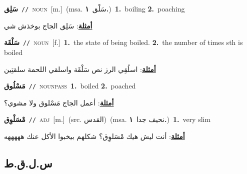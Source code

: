 \documentclass[10pt,a4paper,twoside]{article} %
\begin{document}
\begin{multicols}{2}
{\setlength\topsep{0pt}\textbf{\foreignlanguage{arabic}{سَلِق}}\ {\color{gray}\texttt{//}\color{black}}\ \textsc{noun}\ [m.]\ \color{gray}(msa. \foreignlanguage{arabic}{سَلْق}~\foreignlanguage{arabic}{\textbf{١.}})\color{black}\ \textbf{1.}~boiling  \textbf{2.}~poaching\  \begin{flushright}\color{gray}\foreignlanguage{arabic}{\textbf{\underline{\foreignlanguage{arabic}{أمثلة}}}: سَلِق الجاج بوخذش شي}\end{flushright}\color{black}} \vspace{2mm}

{\setlength\topsep{0pt}\textbf{\foreignlanguage{arabic}{سَلْقَة}}\ {\color{gray}\texttt{//}\color{black}}\ \textsc{noun}\ [f.]\ \textbf{1.}~the state of being boiled.  \textbf{2.}~the number of times sth is boiled\  \begin{flushright}\color{gray}\foreignlanguage{arabic}{\textbf{\underline{\foreignlanguage{arabic}{أمثلة}}}: اسلُقِي الرز نص سَلْقَة واسلقي اللحمة سلقتِين}\end{flushright}\color{black}} \vspace{2mm}

{\setlength\topsep{0pt}\textbf{\foreignlanguage{arabic}{مَسْلُوق}}\ {\color{gray}\texttt{//}\color{black}}\ \textsc{noun\textunderscore pass}\ \textbf{1.}~boiled  \textbf{2.}~poached\  \begin{flushright}\color{gray}\foreignlanguage{arabic}{\textbf{\underline{\foreignlanguage{arabic}{أمثلة}}}: أعمل الجاج مَسْلوق ولا مشوي؟}\end{flushright}\color{black}} \vspace{2mm}

{\setlength\topsep{0pt}\textbf{\foreignlanguage{arabic}{مْسَلْوِق}}\ {\color{gray}\texttt{//}\color{black}}\ \textsc{adj}\ [m.]\ (src. \color{gray}\foreignlanguage{arabic}{القدس}\color{black})\ \color{gray}(msa. \foreignlanguage{arabic}{نحيف جدا}~\foreignlanguage{arabic}{\textbf{١.}})\color{black}\ \textbf{1.}~very slim\  \begin{flushright}\color{gray}\foreignlanguage{arabic}{\textbf{\underline{\foreignlanguage{arabic}{أمثلة}}}: أنت ليش هيك مْسَلوِِق؟ شكلهم بيخبوا الأكل عنك هههههه}\end{flushright}\color{black}} \vspace{2mm}

\vspace{-3mm}
\subsection*{\color{blue}\foreignlanguage{arabic}{س.ل.ق.ط}\color{blue}{}} 


\end{multicols}
\end{document}
